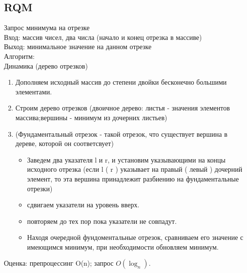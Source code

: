 \documentclass[a4paper]{article}
\begin{document}
\subsection{RQM}
Запрос минимума на отрезке \\
Вход: массив чисел, два числа (начало и конец отрезка в массиве) \\
Выход: минимальное значение на данном отрезке\\
Алгоритм:\\
Динамика (дерево отрезков)
\begin{enumerate}
	\item Дополняем исходный массив до степени двойки бесконечно большими элементами.
	\item  Строим дерево отрезков (двоичное дерево: листья - значения элементов массива;вершины - минимум из дочерних листьев)
	\item (Фундаментальный отрезок - такой отрезок, что существует вершина в дереве, которой он соответсвует) 
	\begin{itemize}
		\item Заведем два указателя l и r, и установим указывающими на концы исходного отрезка (если l ( r ) указывает на правый ( левый ) дочерний элемент, то эта вершина принадлежит разбиению на фундаментальные отрезки)
		\item сдвигаем указатели на уровень вверх.
		\item повторяем до тех пор пока указатели не совпадут.
		\item Находя очередной фундоментальные отрезок, сравниваем его значение с имеющимся минимум, при необходимости обновляем минимум.
	\end{itemize}  
\end{enumerate}
Оценка: препроцессинг O(n); запрос $O(\log_n)$.
\end{document}
